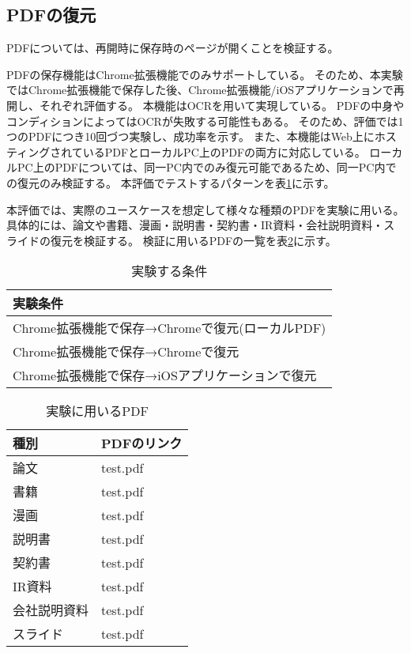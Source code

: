 \subsection{PDFの復元}
PDFについては、再開時に保存時のページが開くことを検証する。

PDFの保存機能はChrome拡張機能でのみサポートしている。
そのため、本実験ではChrome拡張機能で保存した後、Chrome拡張機能/iOSアプリケーションで再開し、それぞれ評価する。
本機能はOCRを用いて実現している。
PDFの中身やコンディションによってはOCRが失敗する可能性もある。
そのため、評価では1つのPDFにつき10回づつ実験し、成功率を示す。
また、本機能はWeb上にホスティングされているPDFとローカルPC上のPDFの両方に対応している。
ローカルPC上のPDFについては、同一PC内でのみ復元可能であるため、同一PC内での復元のみ検証する。
本評価でテストするパターンを表\ref{tb:evl-pdf-conditions}に示す。

本評価では、実際のユースケースを想定して様々な種類のPDFを実験に用いる。
具体的には、論文や書籍、漫画・説明書・契約書・IR資料・会社説明資料・スライドの復元を検証する。
検証に用いるPDFの一覧を表\ref{tb:evl-pdf-list}に示す。

\begin{table}[htbp]
  \label{tb:evl-pdf-conditions}
  \caption{実験する条件}
  \begin{center}
    \begin{tabular}{|l|}
    \hline
    実験条件  \\ \hline
    Chrome拡張機能で保存→Chromeで復元(ローカルPDF) \\ \hline
    Chrome拡張機能で保存→Chromeで復元 \\ \hline
    Chrome拡張機能で保存→iOSアプリケーションで復元 \\ \hline
    \end{tabular}
  \end{center}
\end{table}

\begin{table}[htbp]
  \label{tb:evl-pdf-list}
  \caption{実験に用いるPDF}
  \begin{center}
    \begin{tabular}{|l|l|}
    \hline
    種別 & PDFのリンク  \\ \hline
    論文 & test.pdf \\ \hline
    書籍 & test.pdf \\ \hline
    漫画 & test.pdf \\ \hline
    説明書 & test.pdf \\ \hline
    契約書 & test.pdf \\ \hline
    IR資料 & test.pdf \\ \hline
    会社説明資料 & test.pdf \\ \hline
    スライド & test.pdf \\ \hline
    \end{tabular}
  \end{center}
\end{table}
